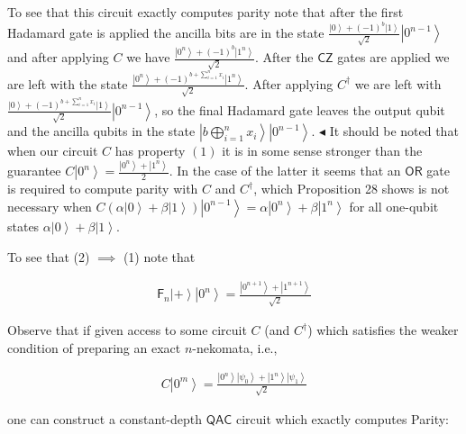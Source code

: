 To see that this circuit exactly computes parity note that after the first Hadamard gate is applied the ancilla bits are in the state $\frac{\left|0\right\rangle+(-1)^{b}\left|1\right\rangle}{\sqrt{2}}\left|0^{n-1}\right\rangle$ and after applying $C$ we have $\frac{\left|0^{n}\right\rangle+(-1)^{b}\left|1^{n}\right\rangle}{\sqrt{2}}$. After the $\mathsf{CZ}$ gates are applied we are left with the state $\frac{\left|0^{n}\right\rangle+(-1)^{b+\sum_{i=1}^{n}x_{i}}\left|1^{n}\right\rangle}{\sqrt{2}}$. After applying $C^{{\dagger}}$ we are left with $\frac{\left|0\right\rangle+(-1)^{b+\sum_{i=1}^{n}x_{i}}\left|1\right\rangle}{\sqrt{2}}\left|0^{n-1}\right\rangle$, so the final Hadamard gate leaves the output qubit and the ancilla qubits in the state $\left|b\bigoplus_{i=1}^{n}x_{i}\right\rangle\left|0^{n-1}\right\rangle$.
$\blacktriangleleft$
It should be noted that when our circuit $C$ has property $(1)$ it is in some sense stronger than the guarantee $C\left|0^{n}\right\rangle=\frac{\left|0^{n}\right\rangle+\left|1^{n}\right\rangle}{2}$. In the case of the latter it seems that an $\mathsf{OR}$ gate is required to compute parity with $C$ and $C^{{\dagger}}$, which Proposition 28 shows is not necessary when $C(\alpha\left|0\right\rangle+\beta\left|1\right\rangle)\left|0^{n-1}\right\rangle=\alpha\left|0^{n}\right\rangle+\beta\left|1^{n}\right\rangle$ for all one-qubit states $\alpha\left|0\right\rangle+\beta\left|1\right\rangle$.\par




To see that (2) $\implies$ (1) note that\par


\[\begin{gathered}
\mathsf{F}_{n}\left|+\right\rangle\left|0^{n}\right\rangle=\frac{\left|0^{n+1}\right\rangle+\left|1^{n+1}\right\rangle}{\sqrt{2}}
\end{gathered}\]


Observe that if given access to some circuit $C$ (and $C^{{\dagger}}$) which satisfies the weaker condition of preparing an exact $n$-nekomata, i.e.,\par


\[\begin{gathered}
\displaystyle C\left|0^{m}\right\rangle=\frac{\left|0^{n}\right\rangle\left|\psi_{0}\right\rangle+\left|1^{n}\right\rangle\left|\psi_{1}\right\rangle}{\sqrt{2}}
\end{gathered}\]


one can construct a constant-depth ${\mathsf{QAC}}$ circuit which exactly computes Parity:\par




